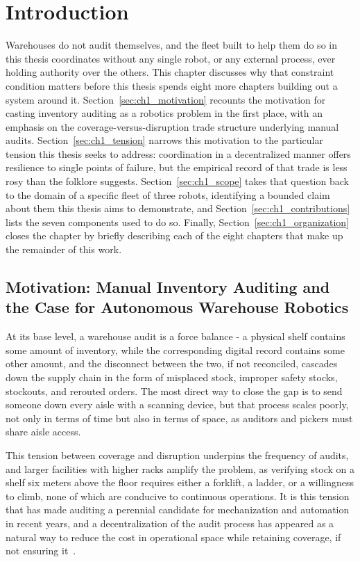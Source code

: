 \chapter{Introduction\label{cha:chapter1}}

Warehouses do not audit themselves, and the fleet built to help them do so in this thesis coordinates without any single robot, or any external process, ever holding authority over the others. This chapter discusses why that constraint condition matters before this thesis spends eight more chapters building out a system around it. Section~\ref{sec:ch1_motivation} recounts the motivation for casting inventory auditing as a robotics problem in the first place, with an emphasis on the coverage-versus-disruption trade structure underlying manual audits. Section~\ref{sec:ch1_tension} narrows this motivation to the particular tension this thesis seeks to address: coordination in a decentralized manner offers resilience to single points of failure, but the empirical record of that trade is less rosy than the folklore suggests. Section~\ref{sec:ch1_scope} takes that question back to the domain of a specific fleet of three robots, identifying a bounded claim about them this thesis aims to demonstrate, and Section~\ref{sec:ch1_contributions} lists the seven components used to do so. Finally, Section~\ref{sec:ch1_organization} closes the chapter by briefly describing each of the eight chapters that make up the remainder of this work.

\section{Motivation: Manual Inventory Auditing and the Case for Autonomous Warehouse Robotics\label{sec:ch1_motivation}}

At its base level, a warehouse audit is a force balance - a physical shelf contains some amount of inventory, while the corresponding digital record contains some other amount, and the disconnect between the two, if not reconciled, cascades down the supply chain in the form of misplaced stock, improper safety stocks, stockouts, and rerouted orders. The most direct way to close the gap is to send someone down every aisle with a scanning device, but that process scales poorly, not only in terms of time but also in terms of space, as auditors and pickers must share aisle access.

This tension between coverage and disruption underpins the frequency of audits, and larger facilities with higher racks amplify the problem, as verifying stock on a shelf six meters above the floor requires either a forklift, a ladder, or a willingness to climb, none of which are conducive to continuous operations. It is this tension that has made auditing a perennial candidate for mechanization and automation in recent years, and a decentralization of the audit process has appeared as a natural way to reduce the cost in operational space while retaining coverage, if not ensuring it~\cite{pallottino2026warehouses}.

